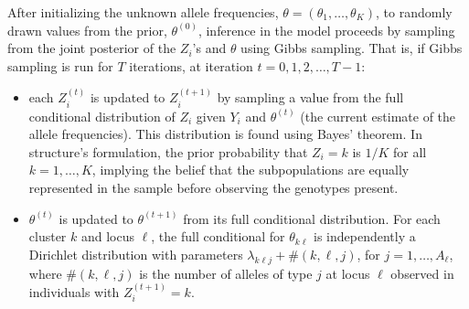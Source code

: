 After initializing the unknown allele frequencies, $\theta = (\theta_1,\ldots,\theta_K)$, to randomly drawn values from the prior,
$\theta^{(0)}$, inference in the model proceeds by sampling from the joint posterior of the 
$Z_i$'s and $\theta$ using Gibbs sampling.  That is, if Gibbs sampling is run for $T$ iterations,
at iteration $t =0, 1, 2, \ldots, T-1$:
\begin{itemize}
\item each $Z^{(t)}_i$ is updated to $Z^{(t+1)}_i$ by sampling a value from 
the full conditional distribution of $Z_i$ given
$Y_i$ and $\theta^{(t)}$ (the current estimate of the allele frequencies).  This
distribution is found using Bayes' theorem. In {\sc structure}'s formulation, the 
prior probability that $Z_i=k$ is $1/K$ for all $k=1,\ldots, K$, implying the belief that the subpopulations are equally
represented in the sample before observing the genotypes present.    
\item $\theta^{(t)}$ is updated to $\theta^{(t+1)}$ from its full conditional distribution.  For each 
cluster
$k$ and locus $\ell$, the full conditional for $\theta_{k\ell}$ is independently a 
Dirichlet distribution with parameters $\lambda_{k\ell j} + \#(k,\ell,j)$, for 
$j=1,\ldots, A_\ell$,
where $\#(k,\ell,j)$ is the number of alleles of type $j$ at locus $\ell$ observed in 
individuals with $Z^{(t+1)}_i = k$.   
\end{itemize}

